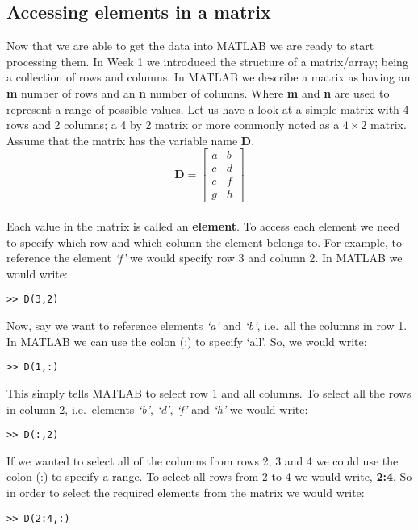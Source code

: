 \documentclass[12pt,a4paper]{article}
\begin{document}
\subsection{Accessing elements in a matrix}
Now that we are able to get the data into MATLAB we are ready to start processing them.  
In Week 1 we introduced the structure of a matrix/array; being a collection of rows and columns.  
In MATLAB we describe a matrix as having an \textbf{m} number of rows and an \textbf{n} number of columns.  
Where \textbf{m} and \textbf{n} are used to represent a range of possible values.  
Let us have a look at a simple matrix with 4 rows and 2 columns; a 
4 by 2 matrix or more commonly noted as a $4\times2$ matrix.  
Assume that the matrix has the variable name \textbf{D}.\\
\[ \textbf{D} = \left[ \begin{array}{cc}
a & b\\
c & d\\
e & f\\
g & h \end{array} \right]\]\\

Each value in the matrix is called an \textbf{element}.  
To access each element we need to specify which row and which column the element belongs to.  
For example, to reference the element \emph{`f'} we would specify row 3 and column 2.  
In MATLAB we would write:
\begin{lstlisting}[style=Matlab-editor]
>> D(3,2)
\end{lstlisting}	
Now, say we want to reference elements \emph{`a'} and \emph{`b'}, i.e.~all the columns in row 1.  
In MATLAB we can use the colon (:) to specify `all'.  
So, we would write:
\begin{lstlisting}[style=Matlab-editor]
>> D(1,:)
\end{lstlisting}

This simply tells MATLAB to select row 1 and all columns.  
To select all the rows in column 2, i.e.~elements \emph{`b'}, \emph{`d'}, \emph{`f'} and \emph{`h'} we would write:
\begin{lstlisting}[style=Matlab-editor]
>> D(:,2)
\end{lstlisting}

If we wanted to select all of the columns from rows 2, 3 and 4 we could use the colon (:) to specify a range.  
To select all rows from 2 to 4 we would write, \textbf{2:4}.  
So in order to select the required elements from the matrix we would write:
\begin{lstlisting}[style=Matlab-editor]
>> D(2:4,:)
\end{lstlisting}
	
\end{document}
